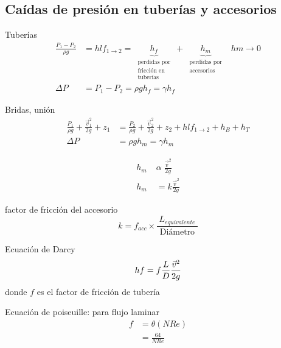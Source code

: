 \subsection{Caídas de presión en tuberías y accesorios}
Tuberías
\[
    \begin{split}
        \frac{ P_{1} - P_{2} }{ \rho g } & = hlf_{1 \to 2} = \underbrace{ h_{f} }_{
            \begin{array}{cc}
                \text{ perdidas por } \\
                \text{ fricción en } \\
                \text{ tuberías }
            \end{array}             
        } + \underbrace{ h_{m} }_{ 
            \begin{array}{cc}
                \text{ perdidas por } \\
                \text{ accesorios }
            \end{array}
        } \;\; hm \to 0 \\
        \Delta P & = P_{1} - P_{2} = \rho g h_{f} = \gamma h_{f}
    \end{split}
\]

Bridas, unión
\[
    \begin{split}
        \frac{ P_{1} }{ \rho g } + \frac{ \Vec{v}_{1}^{2} }{ 2g } + z_{1} & = \frac{ P_{2} }{ \rho g } + \frac{ \Vec{v}_{2}^{2} }{ 2g } + z_{2} + hlf_{1 \to 2} + h_{B} + h_{T} \\
        \Delta P & = \rho g h_{m} = \gamma h_{m}
    \end{split}
\]

\[
    \begin{split}
        h_{m} \; & \alpha \; \frac{ \Vec{v}^{2} }{ 2g } \\
        h_{m} & = k \frac{ \Vec{v}^{2} }{ 2g }
    \end{split}
\]

factor de fricción del accesorio
\[
    k = f_{acc} \times \frac{ L_{equivalente} }{ \text{ Diámetro } }
\]

Ecuación de Darcy
\[
    hf = f \frac{ L }{ D } \frac{ \Vec{v}^{2} }{ 2g } \\
\]
donde \( f \) es el factor de fricción de tubería 

Ecuación de poiseuille: para flujo laminar
\[
    \begin{split}
        f & = \theta(NRe) \\
        & = \frac{ 64 }{ NRe }
    \end{split}
\]

